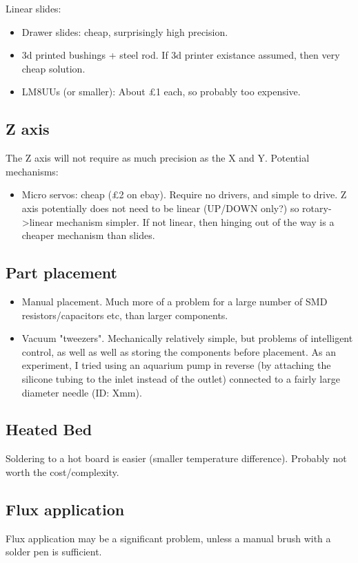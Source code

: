 \documentclass[a4paper,11pt]{article}  %
\begin{document}
Linear slides:

\begin{itemize}
	\item	Drawer slides: cheap, surprisingly high precision.
	\item	3d printed bushings + steel rod. If 3d printer existance assumed, then very cheap solution.
	\item	LM8UUs (or smaller): About £1 each, so probably too expensive.
\end{itemize}

\subsection{Z axis}
The Z axis will not require as much precision as the X and Y. Potential mechanisms:

\begin{itemize}
	\item	Micro servos: cheap (£2 on ebay). Require no drivers, and simple to drive. Z axis potentially
		does not need to be linear (UP/DOWN only?) so rotary-\textgreater linear mechanism simpler. If not linear,
		then hinging out of the way is a cheaper mechanism than slides.
\end{itemize}

\subsection{Part placement}

\begin{itemize}
	\item	Manual placement. Much more of a problem for a large number of SMD resistors/capacitors etc, than
		larger components. 
	\item	Vacuum "tweezers". Mechanically relatively simple, but problems of intelligent control, as well
		as well as storing the components before placement. As an experiment, I tried using an aquarium pump
		in reverse (by attaching the silicone tubing to the inlet instead of the outlet) connected to a fairly
		large diameter needle (ID: Xmm).
\end{itemize}

\subsection{Heated Bed}
Soldering to a hot board is easier (smaller temperature difference). Probably not worth the cost/complexity.

\subsection{Flux application}
Flux application may be a significant problem, unless a manual brush with a solder pen is sufficient.
\end{document}
